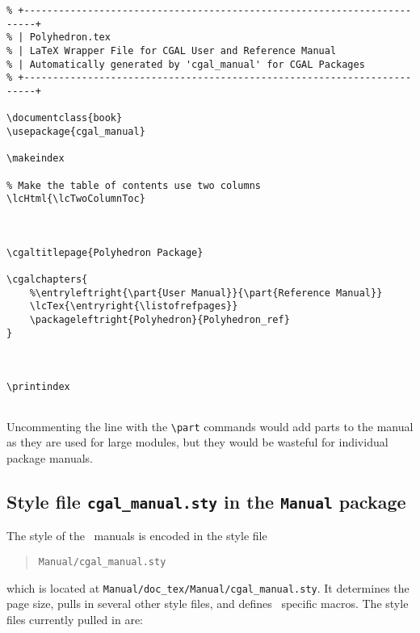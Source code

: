 \begin{verbatim}
% +------------------------------------------------------------------------+
% | Polyhedron.tex
% | LaTeX Wrapper File for CGAL User and Reference Manual
% | Automatically generated by 'cgal_manual' for CGAL Packages
% +------------------------------------------------------------------------+

\documentclass{book}
\usepackage{cgal_manual}

\makeindex

% Make the table of contents use two columns
\lcHtml{\lcTwoColumnToc}



\cgaltitlepage{Polyhedron Package}

\cgalchapters{
    %\entryleftright{\part{User Manual}}{\part{Reference Manual}}
    \lcTex{\entryright{\listofrefpages}}
    \packageleftright{Polyhedron}{Polyhedron_ref}
}



\printindex


\end{verbatim}

Uncommenting the line with the \verb|\part| commands would add parts
to the manual as they are used for large modules, but they would be
wasteful for individual package manuals.

\subsection{Style file \texttt{cgal\_manual.sty} in the
  \texttt{Manual} package}
\label{subsec:manual_style_files}

The style of the \cgal\ manuals is encoded in the style file

\begin{quote}
    \texttt{Manual/cgal\_manual.sty}
\end{quote}

which is located at \texttt{Manual/doc\_tex/Manual/cgal\_manual.sty}. 
It determines the page size, pulls in several other style files, and
defines \cgal\ specific macros. The style files currently pulled in
are:

